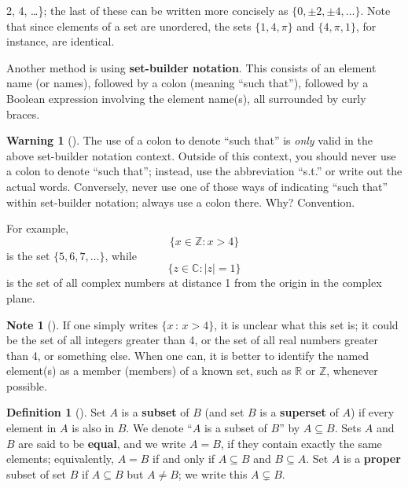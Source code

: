 \documentclass[10pt,openany,oneside]{book}
\newcommand{\terminology}[1]{\textbf{#1}}
\theoremstyle{plain}
\theoremstyle{definition}
\newtheorem{definition}[theorem]{Definition}
\theoremstyle{definition}
\newtheorem{note}[theorem]{Note}
\newtheorem{warning}[theorem]{Warning}
\theoremstyle{definition}
\theoremstyle{definition}
\numberwithin{equation}{section}
\def\Z{\mathbb{Z}}
\def\R{\mathbb{R}}
\def\C{\mathbb{C}}
\begin{document}
2, 4, \ldots\}\); the last of these can be written more concisely as \(\{0,\pm 2, \pm 4,\ldots\}\). Note that since elements of a set are unordered, the sets \(\{1,4,\pi\}\) and \(\{4,\pi, 1\}\), for instance, are identical.%
\par
Another method is using \terminology{set-builder notation}. This consists of an element name (or names), followed by a colon (meaning ``such that''), followed by a Boolean expression involving the element name(s), all surrounded by curly braces.%
\begin{warning}[]\label{warning-1}
The use of a colon to denote ``such that'' is \emph{only} valid in the above set-builder notation context.  Outside of this context, you should never use a colon to denote ``such that''; instead, use the abbreviation ``s.t.'' or write out the actual words.   Conversely, never use one of those ways of indicating ``such that'' within set-builder notation; always use a colon there.  Why?  Convention.%
\end{warning}
For example,%
\begin{equation*}
\{x\in \Z : x > 4\}
\end{equation*}
is the set \(\{5, 6, 7, \ldots\}\), while%
\begin{equation*}
\{z\in \C : |z|=1\}
\end{equation*}
is the set of all complex numbers at distance 1 from the origin in the complex plane.%
\begin{note}[]\label{note-2}
If one simply writes \(\{x\,:\,x>4\}\), it is unclear what this set is; it could be the set of all integers greater than 4, or the set of all real numbers greater than 4, or something else. When one can, it is better to identify the named element(s) as a member (members) of a known set, such as \(\R\) or \(\Z\), whenever possible.%
\end{note}
\begin{definition}[{}]\label{definition-4}
\label{notation-14}
\label{notation-15}
Set \(A\) is a \terminology{subset} of \(B\) (and set \(B\) is a \terminology{superset} of \(A\)) if every element in \(A\) is also in \(B\). We denote ``\(A\) is a subset of \(B\)'' by \(A\subseteq B\). Sets \(A\) and \(B\) are said to be \terminology{equal}, and we write \(A=B\), if they contain exactly the same elements; equivalently, \(A=B\) if and only if \(A \subseteq B\) and \(B\subseteq A\). Set \(A\) is a \terminology{proper} subset of set \(B\) if \(A\subseteq B\) but \(A\neq B\); we write this \(A\subsetneq B\).%
\end{definition}
\end{document}
